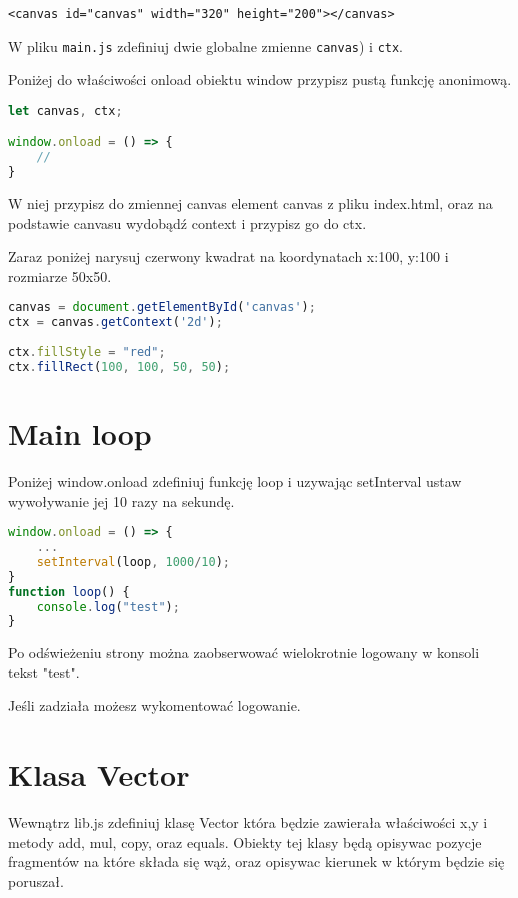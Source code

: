 \documentclass[12pt]{article}
\begin{document}
\begin{verbatim}
<canvas id="canvas" width="320" height="200"></canvas>
\end{verbatim}

W pliku \texttt{main.js} zdefiniuj dwie globalne zmienne \texttt{canvas}) i \texttt{ctx}.

Poniżej do właściwości onload obiektu window przypisz pustą funkcję anonimową.

\begin{lstlisting}[language=JavaScript]
let canvas, ctx;

window.onload = () => {
    //
}
\end{lstlisting}

W niej przypisz do zmiennej canvas element canvas z pliku index.html, oraz na podstawie canvasu wydobądź context i przypisz go do ctx.

Zaraz poniżej narysuj czerwony kwadrat na koordynatach x:100, y:100 i rozmiarze 50x50.

\begin{lstlisting}[language=JavaScript]
canvas = document.getElementById('canvas');
ctx = canvas.getContext('2d');
    
ctx.fillStyle = "red";
ctx.fillRect(100, 100, 50, 50);

\end{lstlisting}

\section{Main loop}

Poniżej window.onload zdefiniuj funkcję loop i uzywając setInterval ustaw wywoływanie jej 10 razy na sekundę.
\begin{lstlisting}[language=JavaScript]
window.onload = () => {
    ...
    setInterval(loop, 1000/10);
}
function loop() {
    console.log("test");
}

\end{lstlisting}
Po odświeżeniu strony można zaobserwować wielokrotnie logowany w konsoli tekst "test".

Jeśli zadziała możesz wykomentować logowanie.

\section{Klasa Vector}

Wewnątrz lib.js zdefiniuj klasę Vector która będzie zawierała właściwości x,y i metody add, mul, copy, oraz equals. Obiekty tej klasy będą opisywac pozycje fragmentów na które składa się wąż, oraz opisywac kierunek w którym będzie się poruszał.
\end{document}
